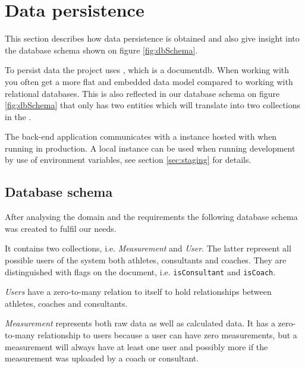 \section{Data persistence}
This section describes how data persistence is obtained and also give insight into the database schema shown on figure \ref{fig:dbSchema}.

To persist data the project uses , which is a \gls{documentdb}.
When working with  you often get a more flat and embedded data model compared to working with relational databases. 
This is also reflected in our database schema on figure \ref{fig:dbSchema} that only has two entities which will translate into two collections in the .

The back-end application communicates with a  instance hosted with  when running in production.
A local instance can be used when running development by use of environment variables, see section \ref{sec:staging} for details.

\subsection{Database schema}
After analysing the domain and the requirements the following database schema was created to fulfil our needs.

It contains two collections, i.e. \textit{Measurement} and \textit{User}. The latter represent all possible users of the system both athletes, consultants and coaches. 
They are distinguished with flags on the document, i.e. \verb+isConsultant+ and \verb+isCoach+.

\textit{Users} have a zero-to-many relation to itself to hold relationships between athletes, coaches and consultants.

\textit{Measurement} represents both raw data as well as calculated data. It has a zero-to-many relationship to users because a user can have zero measurements, but a measurement will always have at least one user and possibly more if the measurement was uploaded by a coach or consultant.

